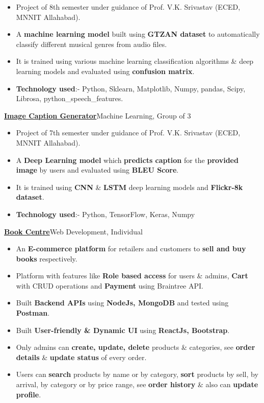 \documentclass[10pt]{extarticle}
\begin{document}
        \begin{itemize}
            \item Project of 8th semester under guidance of Prof. V.K. Srivastav (ECED, MNNIT Allahabad).
            \item A \textbf{machine learning model} built using \textbf{GTZAN dataset} to automatically classify different musical genres from audio files.
            \item It is trained using various machine learning classification algorithms \& deep learning models and evaluated using \textbf{confusion matrix}.
            \item \textbf{Technology used}:- Python, Sklearn, Matplotlib, Numpy, pandas, Scipy, Librosa, python\_speech\_features.
        \end{itemize}
\vspace{5pt}
\href{https://github.com/PSoni8/Image-Caption-Generator}{\textbf{Image Caption Generator}}\hfill Machine Learning, Group of 3
         \begin{itemize}
             \item Project of 7th semester under guidance of Prof. V.K. Srivastav (ECED, MNNIT Allahabad). 
             \item A \textbf{Deep Learning model} which \textbf{predicts caption} for the \textbf{provided image} by users and evaluated using \textbf{BLEU Score}.
             \item It is trained using \textbf{CNN} \& \textbf{LSTM} deep learning models and \textbf{Flickr-8k dataset}.
             \item \textbf{Technology used}:- Python, TensorFlow, Keras, Numpy
         \end{itemize}
\vspace{5pt}         
\href{https://github.com/PSoni8/Bookcentre}{\textbf{Book Centre}}\hfill Web Development, Individual
        \begin{itemize}
           \item An \textbf{E-commerce platform} for retailers and customers to \textbf{sell and buy books} respectively. \item Platform with features like \textbf{Role based access} for users \& admins, \textbf{Cart} with CRUD operations and \textbf{Payment} using Braintree API.
           \item Built \textbf{Backend APIs} using \textbf{NodeJs, MongoDB} and tested using \textbf{Postman}.
           \item Built \textbf{User-friendly \& Dynamic UI} using \textbf{ReactJs, Bootstrap}.
           \item Only admins can \textbf{create, update, delete} products \& categories, see \textbf{order details} \& \textbf{update status} of every order.
           \item Users can \textbf{search} products by name or by category, \textbf{sort} products by sell, by arrival, by category or by price range, see \textbf{order history} \& also can \textbf{update profile}.
        \end{itemize}         
\end{document}
